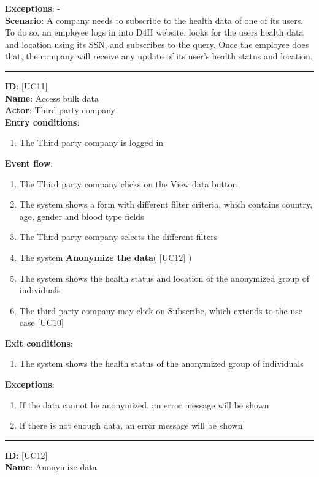 \documentclass[hidelinks, 12pt]{report}
\newcommand\usecase[1]{ [UC#1] }
\begin{document}
\begin{itemize}
\begin{enumerate}
		\end{enumerate}
		\textbf{Exceptions}:  - \\
		\textbf{Scenario}: A company needs to subscribe to the health data of one of its users. To do so, an employee logs in into D4H website, looks for the users health data and location using its SSN, and subscribes to the query. Once the employee does that, the company will receive any update of its user's health status and location.
		\rule{\linewidth}{0.4pt}
		\textbf{ID}: \usecase{11} \\
		\textbf{Name}: Access bulk data \\
		\textbf{Actor}: Third party company \\
		\textbf{Entry conditions}:
		\begin{enumerate}
			\item{The Third party company is logged in}
		\end{enumerate}
		\textbf{Event flow}:
		\begin{enumerate}
			\item{The Third party company clicks on the View data button}
			\item{The system shows a form with different filter criteria, which contains country, age, gender and blood type fields}
			\item{The Third party company selects the different filters}
			\item{The system \textbf{Anonymize the data}(\usecase{12})}
			\item{The system shows the health status and location of the anonymized group of individuals}
			\item{The third party company may click on Subscribe, which extends to the use case \usecase{10}}
		\end{enumerate}
		\textbf{Exit conditions}:
		\begin{enumerate}
			\item{The system shows the health status of the anonymized group of individuals}
		\end{enumerate}
		\textbf{Exceptions}:
		\begin{enumerate}
			\item{If the data cannot be anonymized, an error message will be shown}
			\item{If there is not enough data, an error message will be shown}
		\end{enumerate}
		\rule{\linewidth}{0.4pt}
		\textbf{ID}: \usecase{12} \\
		\textbf{Name}: Anonymize data \\

\end{itemize}
\end{document}
